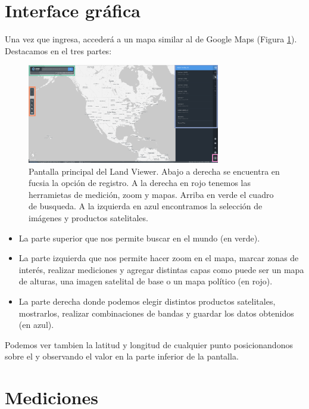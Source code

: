 \documentclass[a4paper,12pt]{book}
\begin{document}
\section{Interface gráfica}

Una vez que ingresa, accederá a un mapa  similar al de Google Maps (Figura \ref{fig:main}).
Destacamos en el tres partes:

\begin{figure}[h!]
    \centering
    \includegraphics[width=0.75\textwidth]{fig:main.png}
    \caption{Pantalla principal del Land Viewer. Abajo a derecha se encuentra en fucsia la opción de registro. A la derecha en rojo tenemos las herramietas de medición, zoom y mapas. Arriba en verde el cuadro de busqueda. A la izquierda en azul encontramos la selección de imágenes y productos satelitales.}
    \label{fig:main}
\end{figure}

\begin{itemize}
    \item La parte superior que nos permite buscar en el mundo (en verde).
    \item La parte izquierda que nos permite hacer zoom en el mapa, marcar zonas de interés, realizar mediciones y agregar distintas capas como puede ser un mapa de alturas, una imagen satelital de base o un mapa político (en rojo).
    \item La parte derecha donde podemos elegir distintos productos satelitales, mostrarlos, realizar combinaciones de bandas y guardar los datos obtenidos (en azul).
\end{itemize}

Podemos ver tambien la latitud y longitud de cualquier punto posicionandonos sobre el y observando el valor en la parte inferior de la pantalla.

\section{Mediciones}
\end{document}
